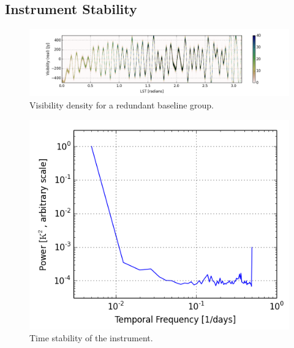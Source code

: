 \documentclass[twocolumn,numberedappendix]{emulateapj} \shorttitle{PSA64}
\begin{document}
%
%
%
%
%
%
%
%
%
%

\subsection{Instrument Stability}

\begin{figure}[!t]
\centering
\includegraphics[width=2.3\columnwidth]{plots/density.png}
\caption{Visibility density for a redundant baseline group.}
\label{fig:density}
\end{figure}

\begin{figure}[!t]
\centering
\includegraphics[width=\columnwidth]{plots/stability.png}
\caption{Time stability of the instrument.}
\label{fig:stability}
\end{figure}
\end{document}
